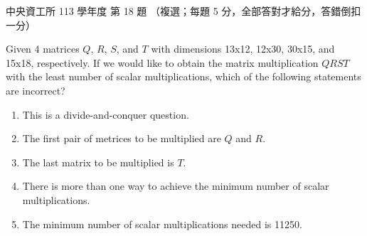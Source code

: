 \begin{pastexam}[label={px:ncu-113-dsa-18}]{中央資工所 113 學年度 第 18 題}
（複選；每題 5 分，全部答對才給分，答錯倒扣一分）

Given 4 matrices $Q$, $R$, $S$, and $T$ with dimensions 13x12, 12x30, 30x15, and 15x18, respectively. If we
would like to obtain the matrix multiplication $QRST$ with the least number of scalar multiplications, which
of the following statements are incorrect?
\begin{enumerate}[label=(\Alph*)]
\item This is a divide-and-conquer question.
\item The first pair of metrices to be multiplied are $Q$ and $R$.
\item The last matrix to be multiplied is $T$.
\item There is more than one way to achieve the minimum number of scalar multiplications.
\item The minimum number of scalar multiplications needed is 11250.
\end{enumerate}
\end{pastexam}

